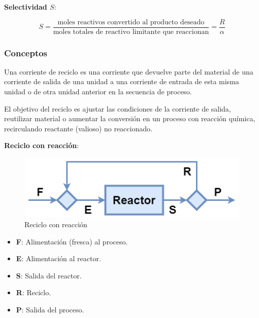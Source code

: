     \textbf{Selectividad \(S\)}:
    \begin{quote}
        \textit{}
    \end{quote}
    \[S = \frac{\text{moles reactivos convertido al producto deseado}}{\text{moles totales de reactivo limitante que reaccionan}} = \frac{R}{\alpha}\]
    
        \subsubsection{Conceptos}
        
            
            
            Una corriente de reciclo es una corriente que devuelve parte del material de una corriente de salida de una unidad a una corriente de entrada de esta misma unidad o de otra unidad anterior en la secuencia de proceso.
            
            El objetivo del reciclo es ajustar las condiciones de la corriente de salida, reutilizar material o aumentar la conversión en un proceso con reacción química, recirculando reactante (valioso) no reaccionado. \newline
            
            \textbf{Reciclo con reacción}:
            
            \begin{figure}
                \centering
                \includegraphics[width=.5\textwidth]{img/esquemas/reciclo_reaccion.png}
                \caption{Reciclo con reacción}
                \label{fig:reciclo_rxn}
            \end{figure}
            
            \begin{multicols}{2}
                \begin{itemize}
                    \item \textbf{F}: Alimentación (fresca) al proceso.
                    \item \textbf{E}: Alimentación al reactor.
                    \item \textbf{S}: Salida del reactor.
                    \item \textbf{R}: Reciclo.
                    \item \textbf{P}: Salida del proceso.
                \end{itemize}
            \end{multicols}
            

